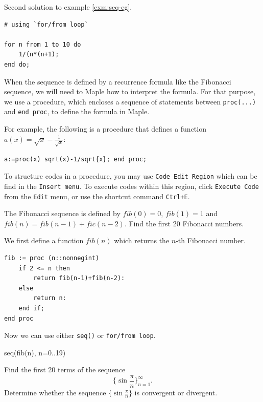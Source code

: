 \documentclass[]{book}
\theoremstyle{definition}
\theoremstyle{definition}
\theoremstyle{definition}
\theoremstyle{remark}
\let\BeginKnitrBlock\begin \let\EndKnitrBlock\end
\begin{document}
\BeginKnitrBlock{solution}
{}Second solution to example \ref{exm:seq-eg}.

\begin{verbatim}
# using `for/from loop`

for n from 1 to 10 do
    1/(n*(n+1);
end do;
\end{verbatim}
\EndKnitrBlock{solution}

When the sequence is defined by a recurrence formula like the Fibonacci sequence, we will need to Maple how to interpret the formula. For that purpose, we use a procedure, which encloses a sequence of statements between \texttt{proc(...)} and \texttt{end\ proc}, to define the formula in Maple.

For example, the following is a procedure that defines a function \(a(x)=\sqrt{x}-\frac{1}{\sqrt{x}}\):

\begin{verbatim}
a:=proc(x) sqrt(x)-1/sqrt{x}; end proc;
\end{verbatim}

To structure codes in a procedure, you may use \texttt{Code\ Edit\ Region} which can be find in the \texttt{Insert\ menu}.
To execute codes within this region, click \texttt{Execute\ Code} from the \texttt{Edit} menu, or use the shortcut command \texttt{Ctrl+E}.

\BeginKnitrBlock{example}
\protect\hypertarget{exm:unnamed-chunk-5}{}{\label{exm:unnamed-chunk-5} }
The Fibonacci sequence is defined by \(fib(0)=0\), \(fib(1)=1\) and \(fib(n)=fib(n-1)+fic(n-2)\).
Find the first 20 Fibonacci numbers.
\EndKnitrBlock{example}

\BeginKnitrBlock{solution}
{}
We first define a function \(fib(n)\) which returns the \(n\)-th Fibonacci number.

\begin{verbatim}
fib := proc (n::nonnegint)
    if 2 <= n then
        return fib(n-1)+fib(n-2):
    else
        return n:
    end if;
end proc
\end{verbatim}

Now we can use either \texttt{seq()} or \texttt{for/from\ loop}.

seq(fib(n), n=0..19)
\EndKnitrBlock{solution}

\BeginKnitrBlock{exercise}
\protect\hypertarget{exr:unnamed-chunk-7}{}{\label{exr:unnamed-chunk-7} }
Find the first 20 terms of the sequence
\[
\{\sin{\frac{\pi}{n}}\}_{n=1}^\infty.
\]
Determine whether the sequence \(\{\sin{\frac{\pi}{n}}\}\) is convergent or divergent.
\EndKnitrBlock{exercise}
\end{document}
